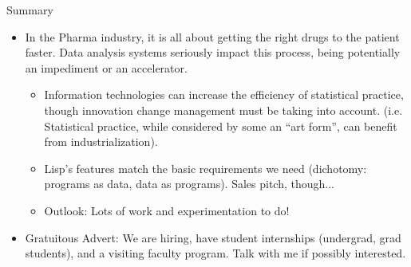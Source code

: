 \documentclass{beamer}
\begin{document}
\begin{frame}{Summary}

  \begin{itemize}
  \item In the Pharma industry, it is all about getting the right
    drugs to the patient faster.  Data analysis systems seriously
    impact this process, being potentially an impediment or an
    accelerator.

    \begin{itemize}
    \item \alert{Information technologies can increase the efficiency
        of statistical practice}, though innovation change management
      must be taking into account.  (i.e. Statistical practice, while
      considered by some an ``art form'', can benefit from
      industrialization).
    \item \alert{Lisp's features match the basic requirements we need}
      (dichotomy: programs as data, data as programs).  Sales pitch,
      though...
    \item Outlook: Lots of work and experimentation to do!
    \end{itemize}
  \item {\tiny Gratuitous Advert: We are hiring, have student
      internships (undergrad, grad students), and a visiting faculty
      program.  Talk with me if possibly interested.}
  \end{itemize}
\end{frame}








\end{document}
